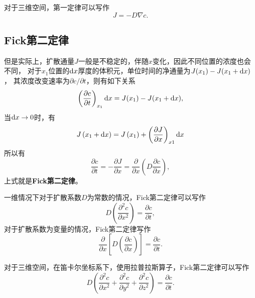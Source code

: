             对于三维空间，第一定律可以写作
            \begin{equation}
                J=-D\nabla c.
            \end{equation}
        \subsection{Fick第二定律}
            但是实际上，扩散通量$J$一般是不稳定的，伴随$x$变化，因此不同位置的浓度也会不同，
            对于$x_1$位置的$\mathop{}\!\mathrm{d} x$厚度的体积元，单位时间的净通量为$J(x_1)-J(x_1+\mathop{}\!\mathrm{d} x)$，
            其浓度改变速率为$\partial c/\partial t$，则有如下关系
            \begin{equation}
                \left( \frac{\partial c}{\partial t} \right)_{x_1}\mathop{}\!\mathrm{d} x=J(x_1)-J(x_1+\mathop{}\!\mathrm{d} x),
            \end{equation}
            当$\mathop{}\!\mathrm{d} x\to0$时，有
            \begin{equation}
                J\left(x_{1}+\mathop{}\!\mathrm{d} x\right)=J\left(x_{1}\right)+\left(\frac{\partial J}{\partial x}\right)_{x 1} \mathop{}\!\mathrm{d} x
            \end{equation}
            所以有
            \begin{equation}
                \frac{\partial c}{\partial t}=-\frac{\partial J}{\partial x}=\frac{\partial}{\partial x}\left(D \frac{\partial c}{\partial x}\right),
            \end{equation}
            上式就是\textbf{Fick第二定律}。
        
            一维情况下对于扩散系数$D$为常数的情况，Fick第二定律可以写作
            \begin{equation}
                D\left(\frac{\partial^{2} c}{\partial x^{2}}\right)=\frac{\partial c}{\partial t},
            \end{equation}
            对于扩散系数为变量的情况，Fick第二定律写作
            \begin{equation}
                \frac{\partial}{\partial x}\left[D\left(\frac{\partial c}{\partial x}\right)\right]=\frac{\partial c}{\partial t}.
            \end{equation}
            
            对于三维空间，在笛卡尔坐标系下，使用拉普拉斯算子，Fick第二定律可以写作
            \begin{equation}
                D\left(\frac{\partial^{2} c}{\partial x^{2}}+\frac{\partial^{2} c}{\partial y^{2}}+\frac{\partial^{2} c}{\partial z^{2}}\right)=\frac{\partial c}{\partial t}.
            \end{equation}

